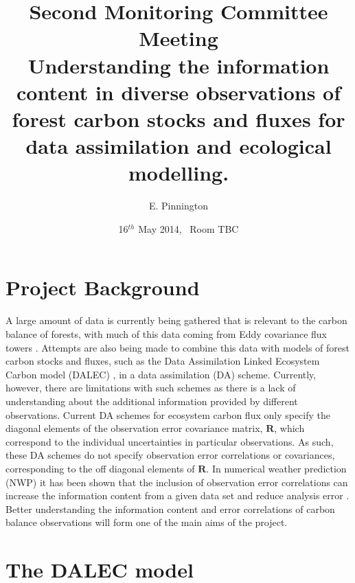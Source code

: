 \documentclass[11pt]{article}
\title{Second Monitoring Committee Meeting\\\vspace{4mm} \normalsize{Understanding the information content in diverse observations of forest carbon stocks and fluxes for data assimilation and ecological modelling.}}
\date{\normalsize{16$^{th}$ May 2014, \ Room TBC}}
\author{\normalsize{E. Pinnington}}
\begin{document}
\maketitle

\section*{Project Background}

A large amount of data is currently being gathered that is relevant to the carbon balance of forests, with much of this data coming from Eddy covariance flux towers \cite{baldocchi2008turner}. Attempts are also being made to combine this data with models of forest carbon stocks and fluxes, such as the Data Assimilation Linked Ecosystem Carbon model (DALEC) \cite{williams2005improved}, in a data assimilation (DA) scheme. Currently, however, there are limitations with such schemes as there is a lack of understanding about the additional information provided by different observations. Current DA schemes for ecosystem carbon flux only specify the diagonal elements of the observation error covariance matrix, $\textbf{R}$, which correspond to the individual uncertainties in particular observations. As such, these DA schemes do not specify observation error correlations or covariances, corresponding to the off diagonal elements of $\textbf{R}$. In numerical weather prediction (NWP) it has been shown that the inclusion of observation error correlations can increase the information content from a given data set and reduce analysis error \cite{stewart2008correlated}. Better understanding the information content and error correlations of carbon balance observations will form one of the main aims of the project.

\section*{The DALEC model}
\end{document}
